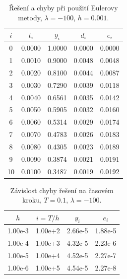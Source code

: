 \documentclass[a4paper, 12pt]{book}
\theoremstyle{definition}
\begin{document}
\begin{table}
\centering
\begin{tabular}{|c|c|c|c|c|}
\hline
$i$ & $t_i$ & $y_i$ & $d_i$ & $e_i$\\ 
\hline
0 & 0.0000 & 1.0000 & 0.0000 & 0.0000\\ 
\hline
1 & 0.0010 & 0.9000 & 0.0048 & 0.0048\\ 
\hline
2 & 0.0020 & 0.8100 & 0.0044 & 0.0087\\ 
\hline
3 & 0.0030 & 0.7290 & 0.0039 & 0.0118\\ 
\hline
4 & 0.0040 & 0.6561 & 0.0035 & 0.0142\\ 
\hline
5 & 0.0050 & 0.5905 & 0.0032 & 0.0160\\ 
\hline
6 & 0.0060 & 0.5314 & 0.0029 & 0.0174\\ 
\hline
7 & 0.0070 & 0.4783 & 0.0026 & 0.0183\\ 
\hline
8 & 0.0080 & 0.4305 & 0.0023 & 0.0189\\ 
\hline
9 & 0.0090 & 0.3874 & 0.0021 & 0.0191\\ 
\hline
10 & 0.0100 & 0.3487 & 0.0019 & 0.0192\\ 
\hline
\hline\end{tabular}
\label{table:reseni}
\caption{Řešení a chyby při použití Eulerovy metody, $\lambda=-100$, $h=0.001$.} 
\end{table}

 \begin{table}
\centering
\begin{tabular}{|c|c|c|c|}
\hline
$h$ & $i=T/h$ & $y_i$ & $e_i$\\ 
\hline
1.00e-3 & 1.00e+2 & 2.66e-5 & 1.88e-5\\ 
\hline
1.00e-4 & 1.00e+3 & 4.32e-5 & 2.23e-6\\ 
\hline
1.00e-5 & 1.00e+4 & 4.52e-5 & 2.27e-7\\ 
\hline
1.00e-6 & 1.00e+5 & 4.54e-5 & 2.27e-8\\ 
\hline
\hline\end{tabular}
\label{table:konvergence}
\caption{Závislost chyby řešení na časovém kroku, $T=0.1$, $\lambda=-100$.} 
\end{table}
\end{document}
